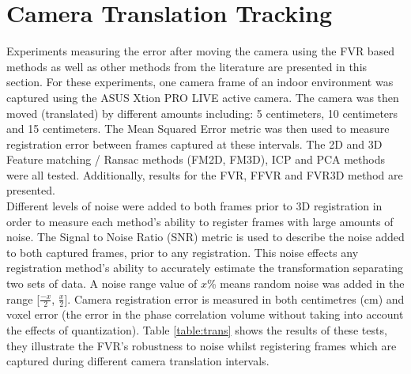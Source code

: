 \section{Camera Translation Tracking}
\label{Sec:CamTransTrackExp}

Experiments measuring the error after moving the camera using the FVR based methods as well as other methods from the literature are presented in this section. For these experiments, one camera frame of an indoor environment was captured using the ASUS Xtion PRO LIVE active camera. The camera was then moved (translated) by different amounts including: 5 centimeters, 10 centimeters and 15 centimeters. The Mean Squared Error metric was then used to measure registration error between frames captured at these intervals. The 2D and 3D Feature matching / Ransac methods (FM2D, FM3D), ICP and PCA methods were all tested. Additionally, results for the FVR, FFVR and FVR3D method are presented. \\

Different levels of noise were added to both frames prior to 3D registration in order to measure each method's ability to register frames with large amounts of noise. The Signal to Noise Ratio (SNR) metric is used to describe the noise added to both captured frames, prior to any registration. This noise effects any registration method's ability to accurately estimate the transformation separating two sets of data. A noise range value of $x$\% means random noise was added in the range [$\frac{-x}{2}$, $\frac{x}{2}$]. Camera registration error is measured in both centimetres (cm) and voxel error (the error in the phase correlation volume without taking into account the effects of quantization). Table \ref{table:trans} shows the results of these tests, they illustrate the FVR's robustness to noise whilst registering frames which are captured during different camera translation intervals. \\




